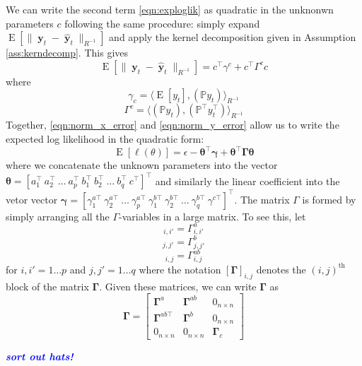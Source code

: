 \documentclass{IEEEtran}
\newcommand{\todo}[1]{\textsf{\emph{\textbf{\textcolor{blue}{#1}}}}}
\newcommand{\inner}[3]{\langle#1,#2\rangle_{#3}}
\newcommand{\dist}[2]{\|#1\|_{#2}}
\DeclareMathOperator{\E}{E}
\DeclareMathOperator{\yvec}{\mathbf{y}}
\begin{document}
We can write the second term \ref{eqn:exploglik} as quadratic in the unknonwn parameters $c$ following the same procedure: simply expand $\E[\dist{\yvec_t-\hat{\yvec}_t}{R^{-1}}]$ and apply the kernel decomposition given in Assumption \ref{ass:kerndecomp}. This gives
\begin{equation}
	\label{eqn:norm_y_error}
	\E[\dist{\yvec_t-\hat{\yvec}_t}{R^{-1}}] = c^\top \gamma^c + c^\top \Gamma^c c
\end{equation}
where
\begin{equation}
	\gamma_c = \inner
	{\E[y_t]}
	{(\mathbb{P} y_t)}
	{R^{-1}}
\end{equation}
\begin{equation}
	 \Gamma^c = \inner
		{(\mathbb{P} y_t)}
		{(\mathbb{P}^\top y_t^\top)}
		{R^{-1}}
\end{equation}
Together, \ref{eqn:norm_x_error} and \ref{eqn:norm_y_error} allow us to write the expected log likelihood in the quadratic form:
\begin{equation}
	\E[\ell(\theta)] = \epsilon - \boldsymbol{\theta}^\top \boldsymbol{\gamma} + \boldsymbol{\theta}^\top \boldsymbol{\Gamma} \boldsymbol{\theta}
\end{equation}
where we concatenate the unknown parameters into the vector $\boldsymbol{\theta} = [a_1^\top ~ a_2^\top ~ \ldots ~ a_p^\top ~ b_1^\top ~ b_2^\top ~ \ldots ~ b_q^\top ~ c^\top]^\top$ and similarly the linear coefficient into the vetor vector $\boldsymbol{\gamma} = [\gamma^{a\top}_1 ~ \gamma^{a\top}_2 ~ \ldots ~ \gamma^{a\top}_p ~ \gamma^{b\top}_1 ~ \gamma^{b\top}_2 ~ \ldots ~ \gamma^{b\top}_q ~ \gamma^{c\top}]^\top$. The matrix $\Gamma$ is formed by simply arranging all the $\Gamma$-variables in a large matrix. To see this, let 
\begin{equation}
	[\boldsymbol{\Gamma}^a]_{i,i'} = \Gamma_{i,i'}^a 
\end{equation}
\begin{equation}
	[\boldsymbol{\Gamma}^b]_{j,j'} = \Gamma_{j,j'}^b 
\end{equation}
\begin{equation}
	[\boldsymbol{\Gamma}^{ab}]_{i,j} = \Gamma_{i,j}^{ab}
\end{equation}
for $i,i' = 1 \ldots p$ and $j,j' = 1 \ldots q$ where the notation $[\boldsymbol{\Gamma}]_{i,j}$ denotes the $(i,j)^\mathrm{th}$ block of the matrix $\boldsymbol{\Gamma}$. Given these matrices, we can write $\boldsymbol{\Gamma}$ as 
\begin{equation}
	\boldsymbol{\Gamma} = \begin{bmatrix}
		\boldsymbol{\Gamma}^a & \boldsymbol{\Gamma}^{ab} & 0_{n\times n} \\
		\boldsymbol{\Gamma}^{ab\top} & \boldsymbol{\Gamma}^{b} & 0_{n\times n} \\
		0_{n\times n} & 0_{n\times n} & \boldsymbol{\Gamma}_c
	\end{bmatrix}
\end{equation}

\todo{sort out hats!}

\newpage
\end{document}
